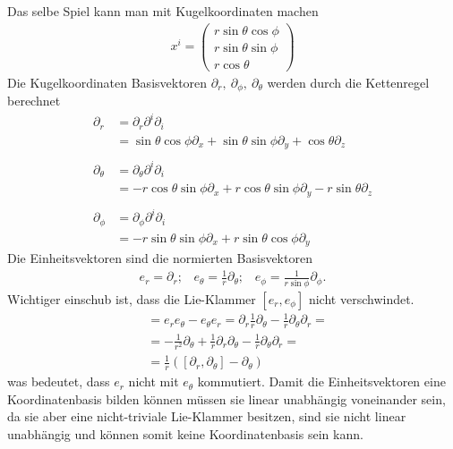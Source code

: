 \documentclass[a4paper]{article}
\begin{document}
Das selbe Spiel kann man mit Kugelkoordinaten machen
\begin{align}
    x^i =
    \begin{pmatrix}
        r\sin\theta\cos\phi\\
        r\sin\theta\sin\phi\\
        r\cos\theta
    \end{pmatrix}
\end{align}
Die Kugelkoordinaten Basisvektoren $\partial _r,\ \partial _\phi,\ \partial
_\theta$ werden durch die Kettenregel berechnet
\begin{align}
    \partial _r &= \partial _r\partial^i\partial_i \\
        &= \sin\theta\cos\phi \partial_x + \sin\theta\sin\phi \partial_y+
        \cos\theta \partial_z\\
        \nonumber\\
        \partial_\theta &= \partial_\theta  \partial^i \partial_i \\
        &=-r\cos\theta \sin\phi \partial_x + r\cos\theta \sin\phi \partial
        _y-r\sin\theta \partial_z\\
        \nonumber\\
        \partial_\phi&= \partial_\phi \partial^i \partial_i \\
        &=-r\sin\theta\sin\phi\partial_x + r\sin\theta\cos\phi \partial_y
\end{align}
Die Einheitsvektoren sind die normierten Basisvektoren
\begin{align}
    e_r = \partial_r;\;\;\; e_\theta = \frac{1}{r}\partial_\theta;\;\;\;
    e_\phi = \frac{1}{r\sin\phi}\partial _\phi.
\end{align}
Wichtiger einschub ist, dass die Lie-Klammer $[e_r, e_\phi]$ nicht
verschwindet.
\begin{align}
    [e_r, e_\theta]&=e_r e_\theta - e_\theta e_r = \partial_r
    \frac{1}{r}\partial_\theta  - \frac{1}{r}\partial_\theta\partial_r =\\
    &=-\frac{1}{r^2}\partial_\theta + \frac{1}{r} \partial_r\partial_\theta
    -\frac{1}{r}\partial_\theta\partial_r=\\
    &=\frac{1}{r}([\partial_r, \partial_\theta] - \partial_\theta)
\end{align}
was bedeutet, dass $e_r$ nicht mit $e_\theta$ kommutiert. Damit die
Einheitsvektoren eine Koordinatenbasis bilden können müssen sie linear
unabhängig voneinander sein, da sie aber eine nicht-triviale Lie-Klammer
besitzen, sind sie nicht linear unabhängig und können somit keine
Koordinatenbasis sein kann.
\end{document}
